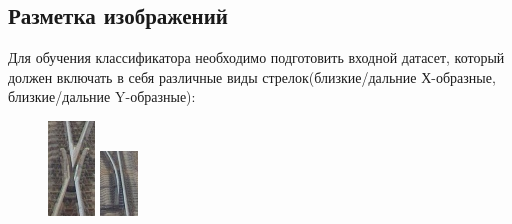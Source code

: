 \subsection{Разметка изображений}
Для обучения классификатора необходимо подготовить входной датасет, который должен включать в себя различные виды стрелок(близкие/дальние Х-образные, близкие/дальние Y-образные):
\begin{figure}[!h]
	\centering
	\begin{minipage}{0.3\textwidth}
		\centering
		\includegraphics[width=0.3\linewidth]{pictures/screenshot3}
		\caption[X]{}
		\label{fig:x}
	\end{minipage}
	\begin{minipage}{0.3\textwidth}
		\centering
		\includegraphics[width=0.3\linewidth]{pictures/screenshot4}
		\caption[Y]{}
		\label{fig:y}
	\end{minipage}
\end{figure}

